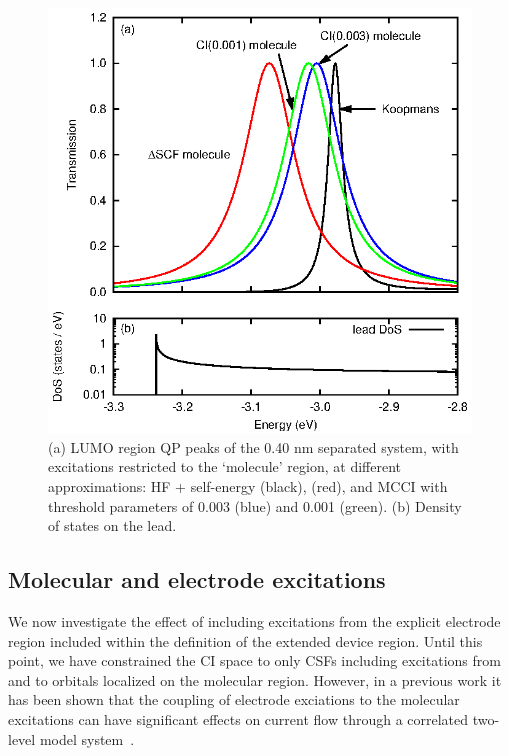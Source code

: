 \begin{figure}
	\begin{center}
		\includegraphics[width=0.9\linewidth]{figures/figure7a_7b}
	\end{center}
	\caption{(a) LUMO region \ac{QP} peaks of the 0.40 nm separated
	         system, with excitations restricted to the `molecule' region,
		 at different approximations: HF + self-energy (black),
		 \dscf (red), and MCCI with threshold parameters of
		 0.003 (blue) and 0.001 (green). (b) Density of states on the
		 lead.}
	\label{fig:all40Alumo}
\end{figure}

\subsection{Molecular and electrode excitations}
We now investigate the effect of including excitations from the
explicit electrode region included within the definition of the extended
device region. Until this point, we have constrained the CI space to only
\acp{CSF} including excitations from and to orbitals localized on the
molecular region. However, in a previous work it has been shown that the
coupling of electrode exciations to the molecular excitations can have
significant effects on current flow through a correlated two-level model
system~\cite{galperin_nitzan2006leadexcitations}. 

